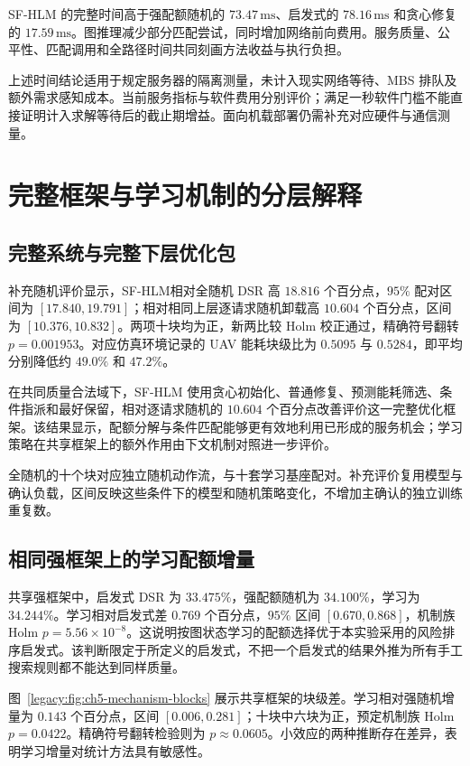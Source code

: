 SF-HLM 的完整时间高于强配额随机的 $73.47\,\mathrm{ms}$、启发式的 $78.16\,\mathrm{ms}$ 和贪心修复的 $17.59\,\mathrm{ms}$。图推理减少部分匹配尝试，同时增加网络前向费用。服务质量、公平性、匹配调用和全路径时间共同刻画方法收益与执行负担。

上述时间结论适用于规定服务器的隔离测量，未计入现实网络等待、MBS 排队及额外需求感知成本。当前服务指标与软件费用分别评价；满足一秒软件门槛不能直接证明计入求解等待后的截止期增益。面向机载部署仍需补充对应硬件与通信测量。

\section{完整框架与学习机制的分层解释}
\label{legacy:sec:ch5-mechanisms}

\subsection{完整系统与完整下层优化包}

补充随机评价显示，SF-HLM相对全随机 DSR 高 $18.816$ 个百分点，$95\%$ 配对区间为 $[17.840,19.791]$；相对相同上层逐请求随机卸载高 $10.604$ 个百分点，区间为 $[10.376,10.832]$。两项十块均为正，新两比较 Holm 校正通过，精确符号翻转 $p=0.001953$。对应仿真环境记录的 UAV 能耗块级比为 $0.5095$ 与 $0.5284$，即平均分别降低约 $49.0\%$ 和 $47.2\%$。

在共同质量合法域下，SF-HLM 使用贪心初始化、普通修复、预测能耗筛选、条件指派和最好保留，相对逐请求随机的 $10.604$ 个百分点改善评价这一完整优化框架。该结果显示，配额分解与条件匹配能够更有效地利用已形成的服务机会；学习策略在共享框架上的额外作用由下文机制对照进一步评价。

全随机的十个块对应独立随机动作流，与十套学习基座配对。补充评价复用模型与确认负载，区间反映这些条件下的模型和随机策略变化，不增加主确认的独立训练重复数。

\subsection{相同强框架上的学习配额增量}

共享强框架中，启发式 DSR 为 $33.475\%$，强配额随机为 $34.100\%$，学习为 $34.244\%$。学习相对启发式差 $0.769$ 个百分点，$95\%$ 区间 $[0.670,0.868]$，机制族 Holm $p=5.56\times10^{-8}$。这说明按图状态学习的配额选择优于本实验采用的风险排序启发式。该判断限定于所定义的启发式，不把一个启发式的结果外推为所有手工搜索规则都不能达到同样质量。

图~\ref{legacy:fig:ch5-mechanism-blocks} 展示共享框架的块级差。学习相对强随机增量为 $0.143$ 个百分点，区间 $[0.006,0.281]$；十块中六块为正，预定机制族 Holm $p=0.0422$。精确符号翻转检验则为 $p\approx0.0605$。小效应的两种推断存在差异，表明学习增量对统计方法具有敏感性。

